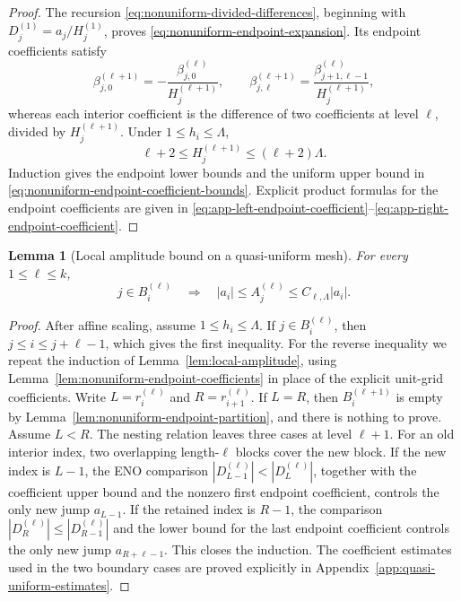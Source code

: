 \documentclass[11pt]{amsart}
\theoremstyle{plain}
\newtheorem{lemma}[theorem]{Lemma}
\theoremstyle{definition}
\theoremstyle{remark}
\numberwithin{equation}{section}
\theoremstyle{plain}
\begin{document}
\begin{proof}
	The recursion \eqref{eq:nonuniform-divided-differences}, beginning with
	$D_j^{(1)}=a_j/H_j^{(1)}$, proves
	\eqref{eq:nonuniform-endpoint-expansion}.  Its endpoint coefficients satisfy
	\[
	\beta_{j,0}^{(\ell+1)}
	=-\frac{\beta_{j,0}^{(\ell)}}{H_j^{(\ell+1)}},
	\qquad
	\beta_{j,\ell}^{(\ell+1)}
	=\frac{\beta_{j+1,\ell-1}^{(\ell)}}{H_j^{(\ell+1)}},
	\]
	whereas each interior coefficient is the difference of two coefficients at
	level $\ell$, divided by $H_j^{(\ell+1)}$.  Under
	$1\le h_i\le\Lambda$,
	\[
	\ell+2\le H_j^{(\ell+1)}\le(\ell+2)\Lambda.
	\]
	Induction gives the endpoint lower bounds and the uniform upper bound in
	\eqref{eq:nonuniform-endpoint-coefficient-bounds}.  Explicit product
	formulas for the endpoint coefficients are given in 
	\eqref{eq:app-left-endpoint-coefficient}--\eqref{eq:app-right-endpoint-coefficient}.
\end{proof}


\begin{lemma}[Local amplitude bound on a quasi-uniform mesh]
	\label{lem:nonuniform-local-amplitude-bound}
	For every $1\le\ell\le k$,
	\begin{equation}\label{eq:nonuniform-two-sided-amplitude}
		j\in B_i^{(\ell)}
		\quad\Longrightarrow\quad
		|a_i|\le A_j^{(\ell)}
		\le C_{\ell,\Lambda}|a_i|.
	\end{equation}
\end{lemma}

\begin{proof}
	After affine scaling, assume $1\le h_i\le\Lambda$.  If
	$j\in B_i^{(\ell)}$, then $j\le i\le j+\ell-1$, which gives the first
	inequality.  For the reverse inequality we repeat the induction of
	Lemma~\ref{lem:local-amplitude}, using
	Lemma~\ref{lem:nonuniform-endpoint-coefficients} in place of the explicit
	unit-grid coefficients.  Write
	$L=r_i^{(\ell)}$ and $R=r_{i+1}^{(\ell)}$.  If $L=R$, then
	$B_i^{(\ell+1)}$ is empty by
	Lemma~\ref{lem:nonuniform-endpoint-partition}, and there is nothing to
	prove.  Assume $L<R$.  The nesting relation leaves
	three cases at level $\ell+1$.  For an old interior index, two overlapping
	length-$\ell$ blocks cover the new block.  If the new index is $L-1$, the
	ENO comparison
	$|D_{L-1}^{(\ell)}|<|D_L^{(\ell)}|$, together with the coefficient upper
	bound and the nonzero first endpoint coefficient, controls the only new
	jump $a_{L-1}$.  If the retained index is $R-1$, the comparison
	$|D_R^{(\ell)}|\le|D_{R-1}^{(\ell)}|$
	and the lower bound for the last endpoint coefficient controls the only
	new jump $a_{R+\ell-1}$.  This closes the
	induction.  The coefficient estimates used in the two boundary cases are
	proved explicitly in Appendix~\ref{app:quasi-uniform-estimates}.
\end{proof}
\end{document}
